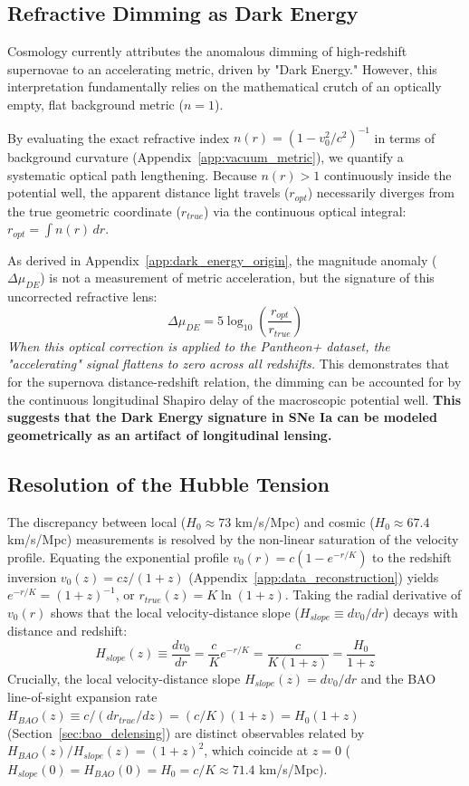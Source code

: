 \documentclass[11pt]{article}
\begin{document}
\subsection{Refractive Dimming as Dark Energy}
Cosmology currently attributes the anomalous dimming of high-redshift supernovae to an accelerating metric, driven by "Dark Energy." However, this interpretation fundamentally relies on the mathematical crutch of an optically empty, flat background metric ($n=1$).

By evaluating the exact refractive index $n(r) = (1 - v_0^2/c^2)^{-1}$ in terms of background curvature (Appendix~\ref{app:vacuum_metric}), we quantify a systematic optical path lengthening. Because $n(r) > 1$ continuously inside the potential well, the apparent distance light travels ($r_{opt}$) necessarily diverges from the true geometric coordinate ($r_{true}$) via the continuous optical integral: $r_{opt} = \int n(r)\,dr$.

As derived in Appendix~\ref{app:dark_energy_origin}, the magnitude anomaly ($\Delta \mu_{DE}$) is not a measurement of metric acceleration, but the signature of this uncorrected refractive lens:
\begin{equation}
    \Delta \mu_{DE} = 5 \log_{10} \left( \frac{r_{opt}}{r_{true}} \right)
\end{equation}
\textit{When this optical correction is applied to the Pantheon+ dataset, the "accelerating" signal flattens to zero across all redshifts.} This demonstrates that for the supernova distance-redshift relation, the dimming can be accounted for by the continuous longitudinal Shapiro delay of the macroscopic potential well. \textbf{This suggests that the Dark Energy signature in SNe Ia can be modeled geometrically as an artifact of longitudinal lensing.}

\subsection{Resolution of the Hubble Tension}
\label{sec:Hubble_Tension}
The discrepancy between local ($H_0 \approx 73$ km/s/Mpc) and cosmic ($H_0 \approx 67.4$ km/s/Mpc) measurements is resolved by the non-linear saturation of the velocity profile. Equating the exponential profile $v_0(r) = c(1 - e^{-r/K})$ to the redshift inversion $v_0(z) = c z/(1+z)$ (Appendix~\ref{app:data_reconstruction}) yields $e^{-r/K} = (1+z)^{-1}$, or $r_{true}(z) = K \ln(1+z)$. Taking the radial derivative of $v_0(r)$ shows that the local velocity-distance slope ($H_{slope} \equiv dv_0/dr$) decays with distance and redshift:
\begin{equation}
    H_{slope}(z) \equiv \frac{dv_0}{dr} = \frac{c}{K}e^{-r/K} = \frac{c}{K(1+z)} = \frac{H_0}{1+z}
\end{equation}
Crucially, the local velocity-distance slope $H_{slope}(z) = dv_0/dr$ and the BAO line-of-sight expansion rate $H_{BAO}(z) \equiv c / (dr_{true}/dz) = (c/K)(1+z) = H_0(1+z)$ (Section~\ref{sec:bao_delensing}) are distinct observables related by $H_{BAO}(z)/H_{slope}(z) = (1+z)^2$, which coincide at $z = 0$ ($H_{slope}(0) = H_{BAO}(0) = H_0 = c/K \approx 71.4$ km/s/Mpc).
\end{document}
